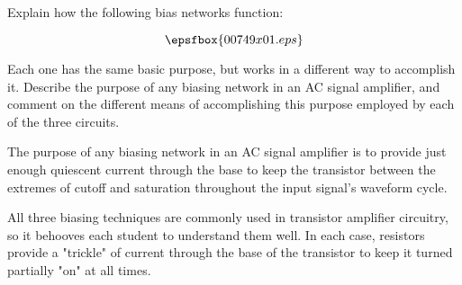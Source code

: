 

Explain how the following bias networks function:

$$\epsfbox{00749x01.eps}$$

Each one has the same basic purpose, but works in a different way to accomplish it.  Describe the purpose of any biasing network in an AC signal amplifier, and comment on the different means of accomplishing this purpose employed by each of the three circuits.







The purpose of any biasing network in an AC signal amplifier is to provide just enough quiescent current through the base to keep the transistor between the extremes of cutoff and saturation throughout the input signal's waveform cycle.







All three biasing techniques are commonly used in transistor amplifier circuitry, so it behooves each student to understand them well.  In each case, resistors provide a "trickle" of current through the base of the transistor to keep it turned partially "on" at all times.




